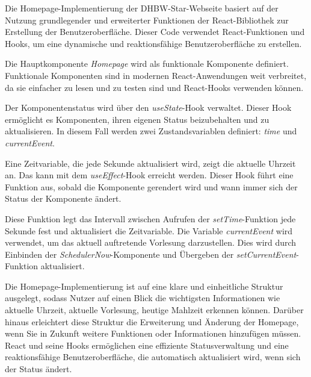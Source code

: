 Die Homepage-Implementierung der DHBW-Star-Webseite basiert auf der Nutzung grundlegender und erweiterter Funktionen der React-Bibliothek zur Erstellung der Benutzeroberfläche. Dieser Code verwendet React-Funktionen und Hooks, um eine dynamische und reaktionsfähige Benutzeroberfläche zu erstellen.

Die Hauptkomponente \emph{Homepage} wird als funktionale Komponente definiert. Funktionale Komponenten sind in modernen React-Anwendungen weit verbreitet, da sie einfacher zu lesen und zu testen sind und React-Hooks verwenden können.

Der Komponentenstatus wird über den \emph{useState}-Hook verwaltet. Dieser Hook ermöglicht es Komponenten, ihren eigenen Status beizubehalten und zu aktualisieren. In diesem Fall werden zwei Zustandsvariablen definiert: \emph{time} und \emph{currentEvent}.

Eine Zeitvariable, die jede Sekunde aktualisiert wird, zeigt die aktuelle Uhrzeit an. Das kann mit dem \emph{useEffect}-Hook erreicht werden. Dieser Hook führt eine Funktion aus, sobald die Komponente gerendert wird und wann immer sich der Status der Komponente ändert.

Diese Funktion legt das Intervall zwischen Aufrufen der \emph{setTime}-Funktion jede Sekunde fest und aktualisiert die Zeitvariable. Die Variable \emph{currentEvent} wird verwendet, um das aktuell auftretende Vorlesung darzustellen. Dies wird durch Einbinden der \emph{SchedulerNow}-Komponente und Übergeben der \emph{setCurrentEvent}-Funktion aktualisiert.

Die Homepage-Implementierung ist auf eine klare und einheitliche Struktur ausgelegt, sodass Nutzer auf einen Blick die wichtigsten Informationen wie aktuelle Uhrzeit, aktuelle Vorlesung, heutige Mahlzeit erkennen können. Darüber hinaus erleichtert diese Struktur die Erweiterung und Änderung der Homepage, wenn Sie in Zukunft weitere Funktionen oder Informationen hinzufügen müssen. React und seine Hooks ermöglichen eine effiziente Statusverwaltung und eine reaktionsfähige Benutzeroberfläche, die automatisch aktualisiert wird, wenn sich der Status ändert.

